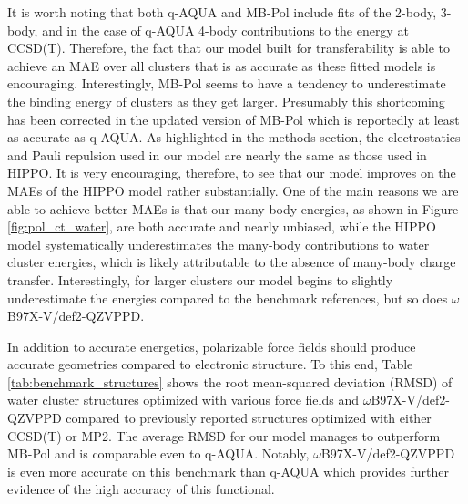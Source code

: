 \documentclass[journal=jctcce,manuscript=article]{achemso}
\begin{document}
It is worth noting that both q-AQUA and MB-Pol include fits of the 2-body, 3-body, and in the case of q-AQUA 4-body contributions to the energy at CCSD(T). Therefore, the fact that our model built for transferability is able to achieve an MAE over all clusters that is as accurate as these fitted models is encouraging. Interestingly, MB-Pol seems to have a tendency to underestimate the binding energy of clusters as they get larger. Presumably this shortcoming has been corrected in the updated version of MB-Pol\cite{zhu2023mb} which is reportedly at least as accurate as q-AQUA. As highlighted in the methods section, the electrostatics and Pauli repulsion used in our  model are nearly the same as those used in HIPPO.\cite{rackers2021polarizable} It is very encouraging, therefore, to see that our model improves on the MAEs of the HIPPO model rather substantially. One of the main reasons we are able to achieve better MAEs is that our many-body energies, as shown in Figure \ref{fig:pol_ct_water}, are both accurate and nearly unbiased, while the HIPPO model systematically underestimates the many-body contributions to water cluster energies\cite{rackers2021polarizable}, which is likely attributable to the absence of many-body charge transfer. Interestingly, for larger clusters our model begins to slightly underestimate the energies compared to the benchmark references, but so does $\omega$B97X-V/def2-QZVPPD. 

In addition to accurate energetics, polarizable force fields should produce accurate geometries compared to electronic structure. To this end, Table \ref{tab:benchmark_structures} shows the root mean-squared deviation (RMSD) of water cluster structures optimized with various force fields and $\omega$B97X-V/def2-QZVPPD compared to previously reported structures optimized with either CCSD(T) or MP2.\cite{herman2023extensive} The average RMSD for our model manages to outperform MB-Pol and is comparable even to q-AQUA. Notably, $\omega$B97X-V/def2-QZVPPD is even more accurate on this benchmark than q-AQUA which provides further evidence of the high accuracy of this functional.
\end{document}
